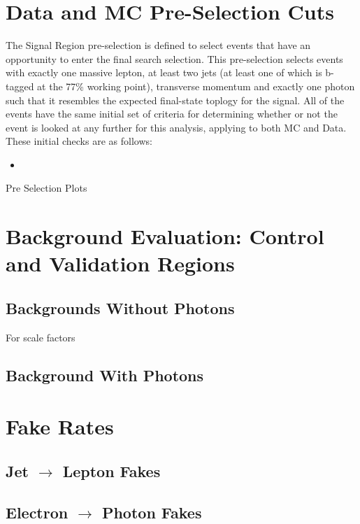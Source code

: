 \section{Data and MC Pre-Selection Cuts}
\label{sec:preselcuts}
The Signal Region pre-selection is defined to select events that have an opportunity to enter the final search selection.  This pre-selection selects events with exactly one massive lepton, at least two jets (at least one of which is b-tagged at the 77\% working point), transverse momentum and exactly one photon such that it resembles the expected final-state toplogy for the signal.  All of the events have the same initial set of criteria for determining whether or not the event is looked at any further for this analysis, applying to both MC and Data.  These initial checks are as follows:
\begin{itemize}
\item
\end{itemize}
Pre Selection Plots

\section{Background Evaluation: Control and Validation Regions}
\label{sec:BkgEvalCRVR}
\subsection{Backgrounds Without Photons}
\label{sec:BKGnoPho}

For scale factors

\subsection{Background With Photons}
\label{sec:BKGPho}

\section{Fake Rates}
\subsection{Jet $\rightarrow$ Lepton Fakes}
\label{sec:FakeLep}

\subsection{Electron $\rightarrow$ Photon Fakes}
\label{sec:FakePho}

